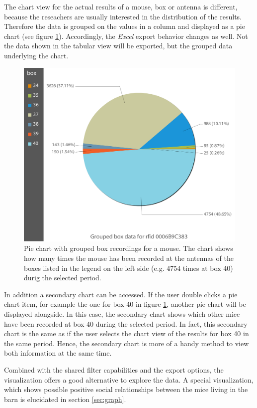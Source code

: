 The chart view for the actual results of a mouse, box or antenna is different, because the reseachers are usually interested in the distribution of the results. Therefore the data is grouped on the values in a column and displayed as a pie chart (see figure \ref{fig:pie_chart_for_mouse}). Accordingly, the \textit{Excel} export behavior changes as well. Not the data shown in the tabular view will be exported, but the grouped data underlying the chart.

\begin{figure}[htbp]
\begin{center}
  \includegraphics[width=.66\textwidth]{assets/img/pie_chart_for_mouse.png}
  \caption[Pie chart of result data for a mouse]{Pie chart with grouped box recordings for a mouse. The chart shows how many times the mouse has been recorded at the antennas of the boxes listed in the legend on the left side (e.g. 4754 times at box 40) durig the selected period.}
  \label{fig:pie_chart_for_mouse}
\end{center}
\end{figure}

In addition a secondary chart can be accessed. If the user double clicks a pie chart item, for example the one for box 40 in figure \ref{fig:pie_chart_for_mouse}, another pie chart will be displayed alongside. In this case, the secondary chart shows which other mice have been recorded at box 40 during the selected period. In fact, this secondary chart is the same as if the user selects the chart view of the results for box 40 in the same period. Hence, the secondary chart is more of a handy method to view both information at the same time.

Combined with the shared filter capabilities and the export options, the visualization offers a good alternative to explore the data. A special visualization, which shows possible positive social relationships between the mice living in the barn is elucidated in section \ref{sec:graph}.

